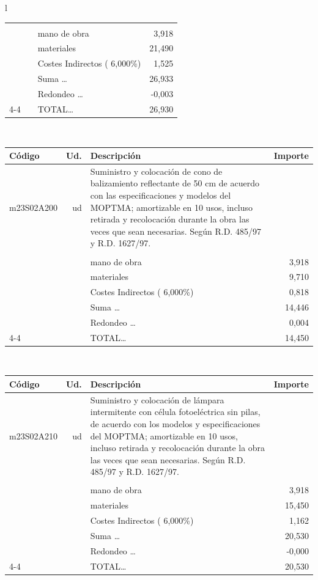 \documentclass{book}%
\begin{document}
\begin{longtable}{l}
\begin{tabular}{l r p{60mm} r}
&&&\\%
&&mano de obra&     3,918\\%
&&materiales&    21,490\\%
&&Costes Indirectos (     6,000\%)&     1,525\\%
&&Suma \ldots&    26,933\\%
&&Redondeo \ldots&    {-}0,003\\%
\cline{4-4}%
&&TOTAL\ldots&    26,930\\%
\end{tabular}\\%
\begin{tabular}{l r p{60mm} r}%
Código&Ud.&Descripción&Importe\\%
\hline%
m23S02A200&ud&Suministro y colocación de cono de balizamiento reflectante de 50 cm de acuerdo con las especificaciones y modelos del MOPTMA; amortizable en 10 usos, incluso retirada y recolocación durante la obra las veces que sean necesarias. Según R.D. 485/97 y R.D. 1627/97.&\\%
&&&\\%
&&mano de obra&     3,918\\%
&&materiales&     9,710\\%
&&Costes Indirectos (     6,000\%)&     0,818\\%
&&Suma \ldots&    14,446\\%
&&Redondeo \ldots&     0,004\\%
\cline{4-4}%
&&TOTAL\ldots&    14,450\\%
\end{tabular}\\%
\begin{tabular}{l r p{60mm} r}%
Código&Ud.&Descripción&Importe\\%
\hline%
m23S02A210&ud&Suministro y colocación de lámpara intermitente con célula fotoeléctrica sin pilas, de acuerdo con los modelos y especificaciones del MOPTMA; amortizable en 10 usos, incluso retirada y recolocación durante la obra las veces que sean necesarias. Según R.D. 485/97 y R.D. 1627/97.&\\%
&&&\\%
&&mano de obra&     3,918\\%
&&materiales&    15,450\\%
&&Costes Indirectos (     6,000\%)&     1,162\\%
&&Suma \ldots&    20,530\\%
&&Redondeo \ldots&    {-}0,000\\%
\cline{4-4}%
&&TOTAL\ldots&    20,530\\%

\end{tabular}
\end{longtable}
\end{document}
